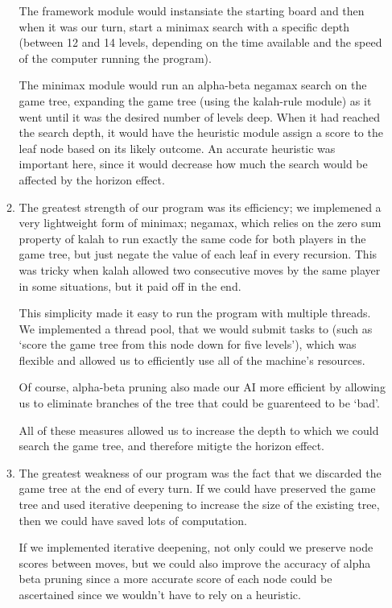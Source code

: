 \documentclass{report}
\begin{document}
\begin{enumerate}
\begin{enumerate}
      The framework module would instansiate the starting board and
      then when it was our turn, start a minimax search with a
      specific depth (between 12 and 14 levels, depending on the time
      available and the speed of the computer running the program).

      The minimax module would run an alpha-beta negamax search on the
      game tree, expanding the game tree (using the kalah-rule module)
      as it went until it was the desired number of levels deep. When
      it had reached the search depth, it would have the heuristic
      module assign a score to the leaf node based on its likely
      outcome. An accurate heuristic was important here, since it
      would decrease how much the search would be affected by the
      horizon effect.
    \item The greatest strength of our program was its efficiency; we
      implemened a very lightweight form of minimax; negamax, which
      relies on the zero sum property of kalah to run exactly the same
      code for both players in the game tree, but just negate the
      value of each leaf in every recursion. This was tricky when
      kalah allowed two consecutive moves by the same player in some
      situations, but it paid off in the end.

      This simplicity made it easy to run the program with multiple
      threads. We implemented a thread pool, that we would submit
      tasks to (such as `score the game tree from this node down for
      five levels'), which was flexible and allowed us to efficiently
      use all of the machine's resources.

      Of course, alpha-beta pruning also made our AI more efficient by
      allowing us to eliminate branches of the tree that could be
      guarenteed to be `bad'.

      All of these measures allowed us to increase the depth to which
      we could search the game tree, and therefore mitigte the horizon
      effect.
    \item The greatest weakness of our program was the fact that we
      discarded the game tree at the end of every turn. If we could
      have preserved the game tree and used iterative deepening to
      increase the size of the existing tree, then we could have saved
      lots of computation.

      If we implemented iterative deepening, not only could we
      preserve node scores between moves, but we could also improve
      the accuracy of alpha beta pruning since a more accurate score
      of each node could be ascertained since we wouldn't have to rely
      on a heuristic.


\end{enumerate}
\end{enumerate}
\end{document}
